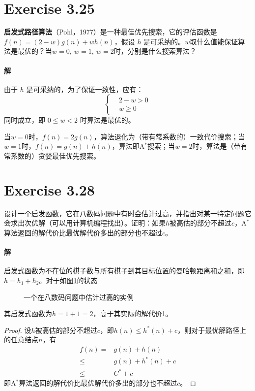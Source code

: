\documentclass{article}
\newcounter{row}
\newcounter{col}
\newcommand\setrow[3]{
  \setcounter{col}{1}
  \foreach \n in {#1, #2, #3} {
    \edef\x{\value{col} - 0.5}
    \edef\y{3.5 - \value{row}}
    \node[anchor = center] at (\x, \y) {\n};
    \stepcounter{col}
  }
  \stepcounter{row}
}
\begin{document}
\section{Exercise 3.25}
\textbf{启发式路径算法}（Pohl，1977）是一种最佳优先搜索，它的评估函数是$f(n) = (2 - w)g(n) + wh(n)$，假设 $h$ 是可采纳的。$w$取什么值能保证算法是最优的？当$w = 0,\ w = 1,\ w = 2$时，分别是什么搜索算法？

\paragraph{解}
由于 $h$ 是可采纳的，为了保证一致性，应有：
\begin{equation*}
    \left\{
        \begin{aligned}
            & 2 - w > 0 \\
            & w \geq 0
        \end{aligned}
    \right.
\end{equation*}
同时成立，即 $0 \leq w < 2$ 时算法是最优的。

当$w = 0$时，$f(n) = 2g(n)$，算法退化为（带有常系数的）一致代价搜索；当$w = 1$时，$f(n) = g(n) + h(n)$，算法即A$^*$搜索；当$w = 2$时，算法是（带有常系数的）贪婪最佳优先搜索。

\section{Exercise 3.28}
设计一个启发函数，它在八数码问题中有时会估计过高，并指出对某一特定问题它会求出次优解（可以用计算机编程找出）。证明：如果$h$被高估的部分不超过$c$，A$^*$算法返回的解代价比最优解代价多出的部分也不超过$c$。

\paragraph{解}
启发式函数为不在位的棋子数与所有棋子到其目标位置的曼哈顿距离和之和，即$h = h_1 + h_2$。对于如图\ref{figure:2}的状态
\begin{figure}[h]
    \centering
    \label{figure:2}
    \caption{一个在八数码问题中估计过高的实例}
\end{figure}
其启发式函数为$h = 1 + 1 = 2$，高于其实际的解代价1。
\begin{proof}
    设$h$被高估的部分不超过$c$，即$h(n) \leq h^*(n) + c$，则对于最优解路径上的任意结点$n$，有
    \begin{align*}
        f(n) = & g(n) + h(n) \\
        \leq & g(n) + h^*(n) + c \\
        \leq & C^* + c
    \end{align*}
    即A$^*$算法返回的解代价比最优解代价多出的部分也不超过$c$。
\end{proof}
\end{document}
